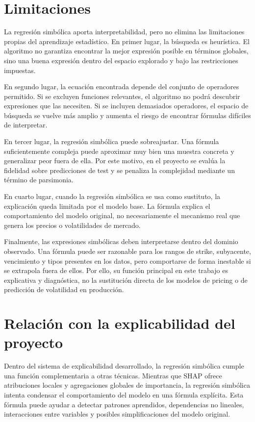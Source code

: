 \section{Limitaciones}

La regresión simbólica aporta interpretabilidad, pero no elimina las limitaciones propias del aprendizaje estadístico. En primer lugar, la búsqueda es heurística. El algoritmo no garantiza encontrar la mejor expresión posible en términos globales, sino una buena expresión dentro del espacio explorado y bajo las restricciones impuestas.

En segundo lugar, la ecuación encontrada depende del conjunto de operadores permitido. Si se excluyen funciones relevantes, el algoritmo no podrá descubrir expresiones que las necesiten. Si se incluyen demasiados operadores, el espacio de búsqueda se vuelve más amplio y aumenta el riesgo de encontrar fórmulas difíciles de interpretar.

En tercer lugar, la regresión simbólica puede sobreajustar. Una fórmula suficientemente compleja puede aproximar muy bien una muestra concreta y generalizar peor fuera de ella. Por este motivo, en el proyecto se evalúa la fidelidad sobre predicciones de test y se penaliza la complejidad mediante un término de parsimonia.

En cuarto lugar, cuando la regresión simbólica se usa como sustituto, la explicación queda limitada por el modelo base. La fórmula explica el comportamiento del modelo original, no necesariamente el mecanismo real que genera los precios o volatilidades de mercado.

Finalmente, las expresiones simbólicas deben interpretarse dentro del dominio observado. Una fórmula puede ser razonable para los rangos de strike, subyacente, vencimiento y tipos presentes en los datos, pero comportarse de forma inestable si se extrapola fuera de ellos. Por ello, su función principal en este trabajo es explicativa y diagnóstica, no la sustitución directa de los modelos de pricing o de predicción de volatilidad en producción.

\section{Relación con la explicabilidad del proyecto}

Dentro del sistema de explicabilidad desarrollado, la regresión simbólica cumple una función complementaria a otras técnicas. Mientras que SHAP ofrece atribuciones locales y agregaciones globales de importancia, la regresión simbólica intenta condensar el comportamiento del modelo en una fórmula explícita. Esta fórmula puede ayudar a detectar patrones aprendidos, dependencias no lineales, interacciones entre variables y posibles simplificaciones del modelo original.

